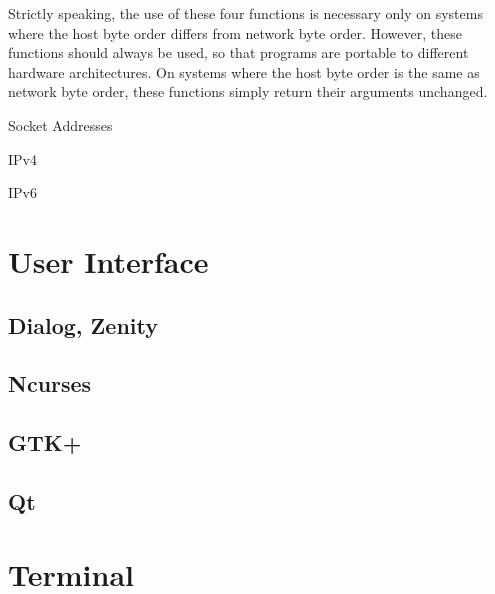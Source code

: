 Strictly speaking, the use of these four functions is necessary only on systems where the
host byte order differs from network byte order. However, these functions should always
be used, so that programs are portable to different hardware architectures. On systems
where the host byte order is the same as network byte order, these functions simply return
their arguments unchanged. 

\begin{frame}{Socket Addresses}
  \begin{block}{IPv4}
    \begin{center}
    \end{center}
  \end{block}
  \begin{block}{IPv6}
    \begin{center}
    \end{center}
  \end{block}
\end{frame}

\section{User Interface}
\label{sec:ui}

\subsection{Dialog, Zenity}
\label{sec:dialog}

\subsection{Ncurses}
\label{sec:curses}

\subsection{GTK+}
\label{sec:gtk+}

\subsection{Qt}
\label{sec:qt}

\section{Terminal}
\label{sec:terminal}

